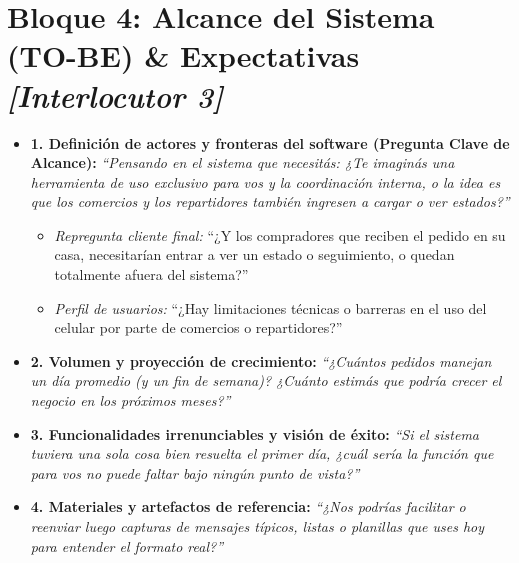 \documentclass[11pt,a4paper]{article}
\begin{document}
\section*{Bloque 4: Alcance del Sistema (TO-BE) \& Expectativas \hfill \normalfont\small\itshape [Interlocutor 3]}
\begin{itemize}
  \item \textbf{1. Definición de actores y fronteras del software (Pregunta Clave de Alcance):}
  \textit{``Pensando en el sistema que necesitás: ¿Te imaginás una herramienta de uso exclusivo para vos y la coordinación interna, o la idea es que los comercios y los repartidores también ingresen a cargar o ver estados?''}
  \begin{itemize}[label=$\circ$]
    \item \textit{Repregunta cliente final:} ``¿Y los compradores que reciben el pedido en su casa, necesitarían entrar a ver un estado o seguimiento, o quedan totalmente afuera del sistema?''
    \item \textit{Perfil de usuarios:} ``¿Hay limitaciones técnicas o barreras en el uso del celular por parte de comercios o repartidores?''
  \end{itemize}

  \item \textbf{2. Volumen y proyección de crecimiento:}
  \textit{``¿Cuántos pedidos manejan un día promedio (y un fin de semana)? ¿Cuánto estimás que podría crecer el negocio en los próximos meses?''}

  \item \textbf{3. Funcionalidades irrenunciables y visión de éxito:}
  \textit{``Si el sistema tuviera una sola cosa bien resuelta el primer día, ¿cuál sería la función que para vos no puede faltar bajo ningún punto de vista?''}

  \item \textbf{4. Materiales y artefactos de referencia:}
  \textit{``¿Nos podrías facilitar o reenviar luego capturas de mensajes típicos, listas o planillas que uses hoy para entender el formato real?''}
\end{itemize}

\end{document}
